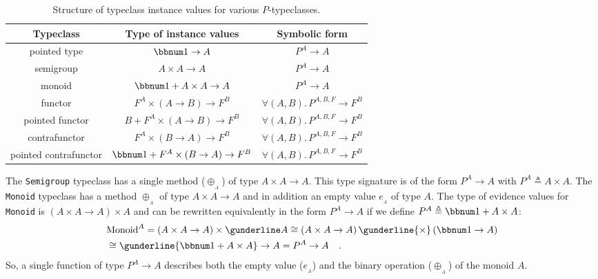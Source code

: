 \begin{table}
\begin{centering}
\begin{tabular}{|c|c|c|}
\hline 
\textbf{\small{}Typeclass} & \textbf{\small{}Type of instance values} & \textbf{\small{}Symbolic form}\tabularnewline
\hline 
\hline 
{\small{}pointed type} & {\small{}$\bbnum 1\rightarrow A$} & {\small{}$P^{A}\rightarrow A$}\tabularnewline
\hline 
{\small{}semigroup} & {\small{}$A\times A\rightarrow A$} & {\small{}$P^{A}\rightarrow A$}\tabularnewline
\hline 
{\small{}monoid} & {\small{}$\bbnum 1+A\times A\rightarrow A$} & {\small{}$P^{A}\rightarrow A$}\tabularnewline
\hline 
{\small{}functor} & {\small{}$F^{A}\times\left(A\rightarrow B\right)\rightarrow F^{B}$} & {\small{}$\forall(A,B).\,P^{A,B,F}\rightarrow F^{B}$}\tabularnewline
\hline 
{\small{}pointed functor} & {\small{}$B+F^{A}\times\left(A\rightarrow B\right)\rightarrow F^{B}$} & {\small{}$\forall(A,B).\,P^{A,B,F}\rightarrow F^{B}$}\tabularnewline
\hline 
{\small{}contrafunctor} & {\small{}$F^{A}\times(B\rightarrow A)\rightarrow F^{B}$} & {\small{}$\forall(A,B).\,P^{A,B,F}\rightarrow F^{B}$}\tabularnewline
\hline 
{\small{}pointed contrafunctor} & {\small{}$\bbnum 1+F^{A}\times\left(B\rightarrow A\right)\rightarrow F^{B}$} & {\small{}$\forall(A,B).\,P^{A,B,F}\rightarrow F^{B}$}\tabularnewline
\hline 
\end{tabular}
\par\end{centering}
\caption{Structure of typeclass instance values for various $P$-typeclasses.\label{tab:Types-of-typeclass-instance-values}}
\end{table}

The \lstinline!Semigroup! typeclass has a single method ($\oplus_{_{A}}$)
of type $A\times A\rightarrow A$. This type signature is of the form
$P^{A}\rightarrow A$ with $P^{A}\triangleq A\times A$. The \lstinline!Monoid!
typeclass has a method $\oplus_{_{A}}$ of type $A\times A\rightarrow A$
and in addition an empty value $e_{_{A}}$ of type $A$. The type
of evidence values for \lstinline!Monoid! is $(A\times A\rightarrow A)\times A$
and can be rewritten equivalently in the form $P^{A}\rightarrow A$
if we define $P^{A}\triangleq\bbnum 1+A\times A$:
\begin{align*}
 & \text{Monoid}^{A}=\left(A\times A\rightarrow A\right)\times\gunderline A\cong\left(A\times A\rightarrow A\right)\gunderline{\times}\,(\bbnum 1\rightarrow A)\\
 & \cong\gunderline{\bbnum 1+A\times A}\rightarrow A=P^{A}\rightarrow A\quad.
\end{align*}
So, a single function of type $P^{A}\rightarrow A$ describes both
the empty value ($e_{_{A}}$) and the binary operation ($\oplus_{_{A}}$)
of the monoid $A$.

